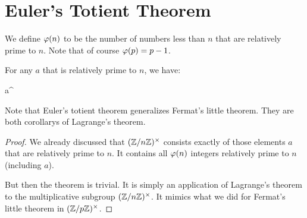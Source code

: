 \section{Euler's Totient Theorem}

\begin{definition}
  We define  $\varphi\mathopen{}\left( {n} \right)\mathclose{}$ to be the
  number of numbers less than $n$ that are relatively prime to $n$. Note
  that of course $\varphi\mathopen{}\left( {p} \right)\mathclose{} = p - 1$.
\end{definition}

\begin{theorem} For any $a$ that is relatively
  prime to $n$, we have:

  \begin{nedqn}
    a^{}
   
  \end{nedqn}
\end{theorem}

\begin{remark}
  Note that Euler's totient theorem generalizes Fermat's little theorem.
  They are both corollarys of Lagrange's theorem.
\end{remark}

\begin{proof}
  We already discussed that $\mathopen{}\left( {\mathbb{Z} / n\mathbb{Z}} \right)\mathclose{}^\times$ consists exactly of those
  elements $a$ that are relatively prime to $n$. It contains all
  $\varphi\mathopen{}\left( {n} \right)\mathclose{}$ integers relatively prime to $n$ (including $a$).

  But then the theorem is trivial. It is simply an application of
  Lagrange's theorem to the multiplicative subgroup $\mathopen{}\left( {\mathbb{Z} / n\mathbb{Z}} \right)\mathclose{}^\times$. It
  mimics what we did for Fermat's little theorem in $\mathopen{}\left( {\mathbb{Z} / p\mathbb{Z}} \right)\mathclose{}^\times$.
\end{proof}
